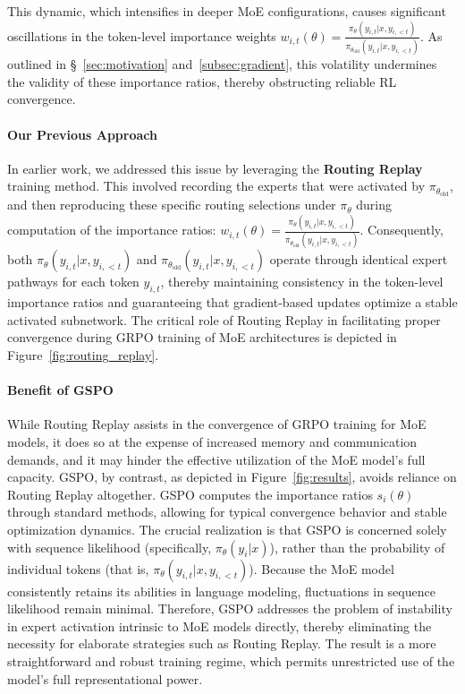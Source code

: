 This dynamic, which intensifies in deeper MoE configurations, causes significant oscillations in the token-level importance weights $w_{i,t}(\theta) = \frac{ \pi_{\theta} (y_{i,t} | x, y_{i,<t}) }{ \pi_{\theta_\text{old}} (y_{i,t} | x,y_{i,<t})}$. As outlined in \S~\ref{sec:motivation} and~\ref{subsec:gradient}, this volatility undermines the validity of these importance ratios, thereby obstructing reliable RL convergence.

\paragraph{Our Previous Approach} In earlier work, we addressed this issue by leveraging the \textbf{Routing Replay} training method. This involved recording the experts that were activated by $\pi_{\theta_\text{old}}$, and then reproducing these specific routing selections under $\pi_{\theta}$ during computation of the importance ratios: $w_{i,t}(\theta) = \frac{ \pi_{\theta} (y_{i,t} | x, y_{i,<t}) }{ \pi_{\theta_\text{old}} (y_{i,t} | x,y_{i,<t})}$. Consequently, both $\pi_{\theta} (y_{i,t} | x, y_{i,<t})$ and $\pi_{\theta_\text{old}} (y_{i,t} | x,y_{i,<t})$ operate through identical expert pathways for each token $y_{i,t}$, thereby maintaining consistency in the token-level importance ratios and guaranteeing that gradient-based updates optimize a stable activated subnetwork. The critical role of Routing Replay in facilitating proper convergence during GRPO training of MoE architectures is depicted in Figure~\ref{fig:routing_replay}.

\paragraph{Benefit of GSPO} While Routing Replay assists in the convergence of GRPO training for MoE models, it does so at the expense of increased memory and communication demands, and it may hinder the effective utilization of the MoE model’s full capacity. GSPO, by contrast, as depicted in Figure~\ref{fig:results}, avoids reliance on Routing Replay altogether. GSPO computes the importance ratios $s_i(\theta)$ through standard methods, allowing for typical convergence behavior and stable optimization dynamics. The crucial realization is that GSPO is concerned solely with sequence likelihood (specifically, $\pi_{\theta} (y_i | x)$), rather than the probability of individual tokens (that is, $\pi_{\theta} (y_{i,t} | x, y_{i,<t})$). Because the MoE model consistently retains its abilities in language modeling, fluctuations in sequence likelihood remain minimal. Therefore, GSPO addresses the problem of instability in expert activation intrinsic to MoE models directly, thereby eliminating the necessity for elaborate strategies such as Routing Replay. The result is a more straightforward and robust training regime, which permits unrestricted use of the model's full representational power.

